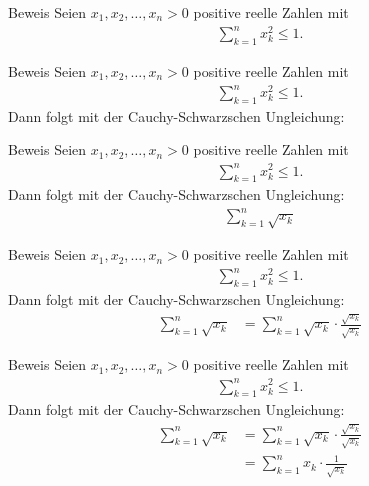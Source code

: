 \documentclass[10pt]{beamer}
\begin{document}
\begin{frame}{Beweis}
    Seien \( x_{1}, x_{2}, \ldots, x_{n} > 0 \) positive reelle Zahlen mit 
    \begin{align*}
        \sum_{k = 1}^{n} x_{k}^{2} 
        \leq 1.
    \end{align*}
\end{frame}



\begin{frame}{Beweis}
    Seien \( x_{1}, x_{2}, \ldots, x_{n} > 0 \) positive reelle Zahlen mit 
    \begin{align*}
        \sum_{k = 1}^{n} x_{k}^{2} 
        \leq 1.
    \end{align*}
    Dann folgt mit der Cauchy-Schwarzschen Ungleichung:
\end{frame}



\begin{frame}{Beweis}
    Seien \( x_{1}, x_{2}, \ldots, x_{n} > 0 \) positive reelle Zahlen mit 
    \begin{align*}
        \sum_{k = 1}^{n} x_{k}^{2} 
        \leq 1.
    \end{align*}
    Dann folgt mit der Cauchy-Schwarzschen Ungleichung:
    \begin{align*}
        \sum_{k = 1}^{n} \sqrt{x_{k}}
    \end{align*}
\end{frame}



\begin{frame}{Beweis}
    Seien \( x_{1}, x_{2}, \ldots, x_{n} > 0 \) positive reelle Zahlen mit 
    \begin{align*}
        \sum_{k = 1}^{n} x_{k}^{2} 
        \leq 1.
    \end{align*}
    Dann folgt mit der Cauchy-Schwarzschen Ungleichung:
    \begin{align*}
        \sum_{k = 1}^{n} \sqrt{x_{k}}
        & = \sum_{k = 1}^{n} \sqrt{x_{k}} \cdot \frac{\sqrt{x_{k}}}{\sqrt{x_{k}}}
    \end{align*}
\end{frame}



\begin{frame}{Beweis}
    Seien \( x_{1}, x_{2}, \ldots, x_{n} > 0 \) positive reelle Zahlen mit 
    \begin{align*}
        \sum_{k = 1}^{n} x_{k}^{2} 
        \leq 1.
    \end{align*}
    Dann folgt mit der Cauchy-Schwarzschen Ungleichung:
    \begin{align*}
        \sum_{k = 1}^{n} \sqrt{x_{k}}
        & = \sum_{k = 1}^{n} \sqrt{x_{k}} \cdot \frac{\sqrt{x_{k}}}{\sqrt{x_{k}}} \\
        & = \sum_{k = 1}^{n} x_{k} \cdot \frac{1}{\sqrt{x_{k}}}
    \end{align*}
\end{frame}
\end{document}
